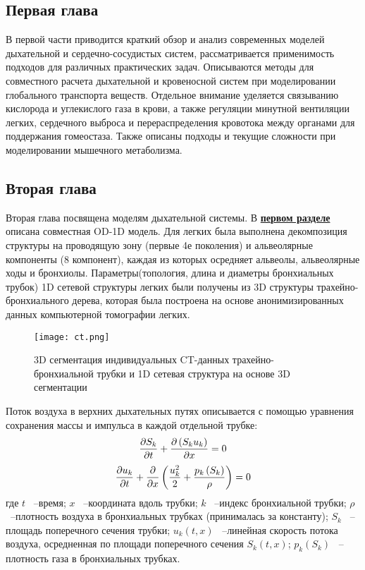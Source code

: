 \subsection*{Первая глава}

В первой части приводится краткий обзор и анализ современных моделей дыхательной и сердечно-сосудистых систем, рассматривается применимость подходов для различных практических задач. Описываются методы для совместного расчета дыхательной и кровеносной систем при моделировании глобального транспорта веществ. Отдельное внимание уделяется связыванию кислорода и углекислого газа в крови, а также регуляции минутной вентиляции легких, сердечного выброса и перераспределения кровотока между органами для поддержания гомеостаза. Также описаны подходы и текущие сложности при моделировании мышечного метаболизма. 
\subsection*{Вторая глава}

Вторая глава посвящена моделям дыхательной системы. В \underline{\textbf{первом разделе}} описана совместная OD-1D модель. Для легких была выполнена декомпозиция структуры на проводящую зону (первые 4е поколения) и альвеолярные компоненты (8 компонент), каждая из которых осредняет альвеолы, альвеолярные ходы и бронхиолы. Параметры(топология, длина и диаметры бронхиальных трубок) 1D сетевой структуры легких были получены из 3D структуры трахейно-бронхиального дерева, которая была построена на основе анонимизированных данных компьютерной томографии легких. 
\begin{figure}[!ht]
	\centering
	\texttt{[image: ct.png]}
	\caption{3D сегментация индивидуальных CT-данных трахейно-бронхиальной трубки и 1D сетевая структура на основе 3D сегментации} 
	\label{s2vechart}
\end{figure}
Поток воздуха в верхних дыхательных путях описывается с помощью уравнения сохранения массы и импульса в каждой отдельной трубке:
\begin{equation} 
\frac{\partial S_{k} }{\partial t} +\frac{\partial \left(S_{k} u_{k} \right)}{\partial x} =0 \notag
\end{equation} 
\begin{equation} 
\frac{\partial u_{k} }{\partial t} +\frac{\partial }{\partial x} \left(\frac{u_{k}^{2} }{2} +\frac{p_{k} \left(S_{k} \right)}{\rho } \right)=0 \notag  
\end{equation} 
где $t$ ~--время; $x$ ~--координата вдоль трубки; $k$ ~--индекс бронхиальной трубки; $\rho $ ~--плотность воздуха в бронхиальных трубках (принималась за константу); $S_{k} $ ~--площадь поперечного сечения трубки; $u_{k} \left(t,x\right)$ ~--линейная скорость потока воздуха, осредненная по площади поперечного сечения $S_{k} \left(t,x\right)$; $p_{k} \left(S_{k} \right)$ ~--плотность газа в бронхиальных трубках. 

